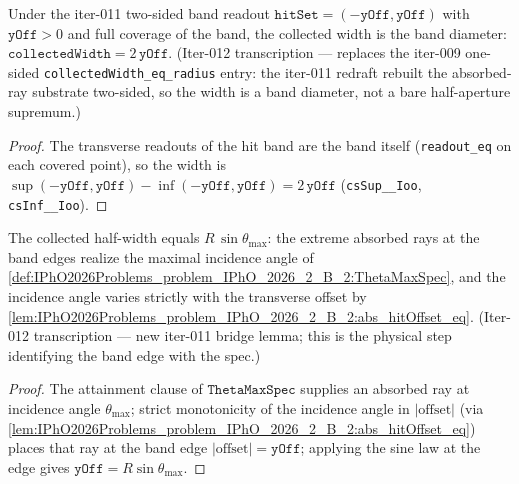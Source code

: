 \begin{lemma}
\label{lem:IPhO2026Problems_problem_IPhO_2026_2_B_2:collectedWidth_eq_two_mul_yOff}
Under the iter-011 two-sided band readout
$\texttt{hitSet} = (-\texttt{yOff}, \texttt{yOff})$ with
$\texttt{yOff} > 0$ and full coverage of the band, the collected width
is the band diameter:
$\texttt{collectedWidth} = 2\,\texttt{yOff}$.
(Iter-012 transcription --- replaces the iter-009 one-sided
\texttt{collectedWidth\_eq\_radius} entry: the iter-011 redraft rebuilt
the absorbed-ray substrate two-sided, so the width is a band diameter,
not a bare half-aperture supremum.)
\end{lemma}
\begin{proof}
The transverse readouts of the hit band are the band itself
(\texttt{readout\_eq} on each covered point), so the width is
$\sup (-\texttt{yOff}, \texttt{yOff}) -
\inf (-\texttt{yOff}, \texttt{yOff}) = 2\,\texttt{yOff}$
(\texttt{csSup\__Ioo}, \texttt{csInf\__Ioo}).
\end{proof}

\begin{lemma}
\label{lem:IPhO2026Problems_problem_IPhO_2026_2_B_2:yOff_eq_R_sin_thetaMax}
The collected half-width equals $R\,\sin\theta_{\max}$: the extreme
absorbed rays at the band edges realize the maximal incidence angle of
\cref{def:IPhO2026Problems_problem_IPhO_2026_2_B_2:ThetaMaxSpec}, and the
incidence angle varies strictly with the transverse offset by
\cref{lem:IPhO2026Problems_problem_IPhO_2026_2_B_2:abs_hitOffset_eq}.
(Iter-012 transcription --- new iter-011 bridge lemma; this is the
physical step identifying the band edge with the spec.)
\end{lemma}
\begin{proof}
The attainment clause of $\texttt{ThetaMaxSpec}$ supplies an absorbed
ray at incidence angle $\theta_{\max}$; strict monotonicity of the
incidence angle in $|\text{offset}|$ (via
\cref{lem:IPhO2026Problems_problem_IPhO_2026_2_B_2:abs_hitOffset_eq})
places that ray at the band edge $|\text{offset}| = \texttt{yOff}$;
applying the sine law at the edge gives
$\texttt{yOff} = R\sin\theta_{\max}$.
\end{proof}

